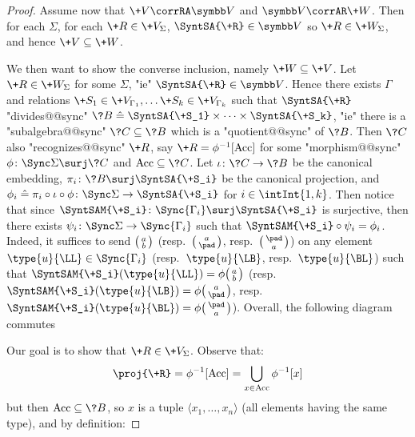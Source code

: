 \begin{proof}
	 Assume now that $\+V \corrRA \B{V}$
	and $\B{V} \corrAR \+W$. Then for each $\Sigma$, for each $\+R \in \+V_{\Sigma}$,
	$\SyntSA{\+R} \in \B{V}$ so $\+R \in \+W_{\Sigma}$, and hence $\+V \subseteq \+W$.

	We then want to show the converse inclusion, namely $\+W \subseteq \+V$. Let $\+R \in \+W_{\Sigma}$ for some $\Sigma$, "ie" $\SyntSA{\+R} \in \B{V}$.
	Hence there exists $\Gamma$ and relations $\+S_1 \in \+V_{\Gamma_1}, \dotsc \+S_k \in \+V_{\Gamma_k}$
	such that $\SyntSA{\+R}$ "divides@@sync"
	$\?B \defeq \SyntSA{\+S_1} \times \cdots \times \SyntSA{\+S_k}$,
	"ie" there is a "subalgebra@@sync" $\?C \subseteq \?B$ which is a "quotient@@sync" of $\?B$.
	Then $\?C$ also "recognizes@@sync" $\+R$, say $\+R = \phi^{-1}[\Acc]$ for some
	"morphism@@sync" $\phi\colon \Sync\Sigma \surj \?C$ and $\Acc \subseteq \?C$.
	Let $\iota\colon \?C \to \?B$ be the canonical embedding,
	$\pi_i\colon \?B \surj \SyntSA{\+S_i}$ be the canonical projection,
	and $\phi_i \defeq \pi_i \circ \iota \circ \phi\colon \Sync\Sigma \to \SyntSA{\+S_i}$
	for $i \in \intInt{1,k}$. Then notice that since $\SyntSAM{\+S_i}\colon \Sync{\Gamma_i} \surj \SyntSA{\+S_i}$ is surjective, then there exists $\psi_i \colon \Sync\Sigma \to \Sync{\Gamma_i}$ such that $\SyntSAM{\+S_i} \circ \psi_i = \phi_i$. Indeed, it suffices
	to send $\pair{a}{b}$ (resp.~$\pair{a}{\pad}$, resp.~$\pair{\pad}{a}$)
	on any element $\type{u}{\LL} \in \Sync{\Gamma_i}$ (resp.~$\type{u}{\LB}$,
	resp.~$\type{u}{\BL}$) such that $\SyntSAM{\+S_i}(\type{u}{\LL}) = \phi\pair{a}{b}$
	(resp.~$\SyntSAM{\+S_i}(\type{u}{\LB}) = \phi\pair{a}{\pad}$,
	resp.~$\SyntSAM{\+S_i}(\type{u}{\BL}) = \phi\pair{\pad}{a}$). Overall, the following diagram
	commutes
	\begin{center}
	\end{center}
	Our goal is to show that $\+R \in \+V_{\Sigma}$. Observe that:
	\[
		\proj{\+R} =
		\phi^{-1}[\Acc] = \bigcup_{x \in \Acc} \phi^{-1}[x]
	\]
	but then $\Acc \subseteq \?B$, so $x$ is a tuple $\langle x_1, \dotsc, x_n \rangle$
	(all elements having the same type), and by definition:

\end{proof}
